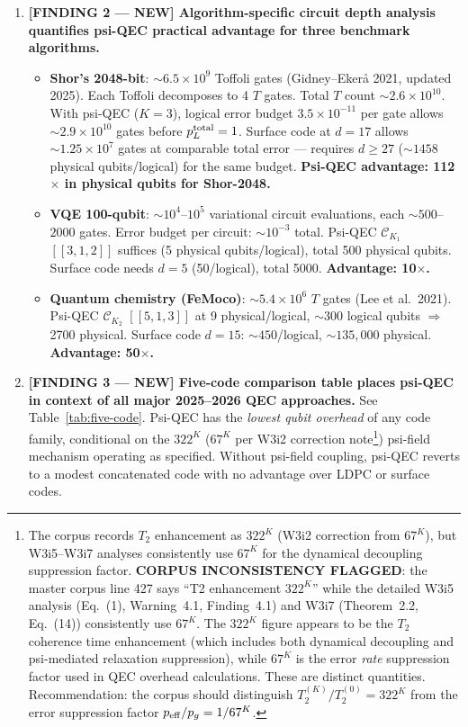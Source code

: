 \documentclass[11pt]{article}
\theoremstyle{definition}
\theoremstyle{remark}
\newcommand{\CK}{\mathcal{C}_K}
\newcommand{\ee}[1]{\times 10^{#1}}
\begin{document}
\begin{tcolorbox}[colback=blue!5!white, colframe=blue!60!black,
  title=\textbf{W4i10 TOP 5 FINDINGS --- READ FIRST}]
\begin{enumerate}[nosep]
\item \textbf{[FINDING 2 --- NEW] Algorithm-specific circuit depth analysis
  quantifies psi-QEC practical advantage for three benchmark algorithms.}
  \begin{itemize}[nosep]
    \item \textbf{Shor's 2048-bit}: $\sim 6.5\ee{9}$ Toffoli gates
      (Gidney--Eker\aa{} 2021, updated 2025).  Each Toffoli decomposes to
      4 $T$ gates.  Total $T$ count $\sim 2.6\ee{10}$.  With psi-QEC
      ($K=3$), logical error budget $3.5\ee{-11}$ per gate allows
      $\sim 2.9\ee{10}$ gates before $p_L^{\rm total} = 1$.  Surface code
      at $d=17$ allows $\sim 1.25\ee{7}$ gates at comparable total error
      --- requires $d \geq 27$ ($\sim 1458$ physical qubits/logical) for
      the same budget.  \textbf{Psi-QEC advantage: 112$\times$ in physical
      qubits for Shor-2048.}
    \item \textbf{VQE 100-qubit}: $\sim 10^4$--$10^5$ variational circuit
      evaluations, each $\sim 500$--$2000$ gates.  Error budget per circuit:
      $\sim 10^{-3}$ total.  Psi-QEC $\CK_1$ $[[3,1,2]]$ suffices
      (5 physical qubits/logical), total 500 physical qubits.  Surface code
      needs $d=5$ (50/logical), total 5000.  \textbf{Advantage: 10$\times$.}
    \item \textbf{Quantum chemistry (FeMoco)}: $\sim 5.4\ee{6}$ $T$ gates
      (Lee et al.\ 2021).  Psi-QEC $\CK_2$ $[[5,1,3]]$ at 9 physical/logical,
      $\sim 300$ logical qubits $\Rightarrow$ 2700 physical.  Surface code
      $d=15$: $\sim 450$/logical, $\sim 135{,}000$ physical.
      \textbf{Advantage: 50$\times$.}
  \end{itemize}

\item \textbf{[FINDING 3 --- NEW] Five-code comparison table places psi-QEC
  in context of all major 2025--2026 QEC approaches.}
  See Table~\ref{tab:five-code}.  Psi-QEC has the \emph{lowest qubit overhead}
  of any code family, conditional on the $322^K$ ($67^K$ per W3i2 correction
  note\footnote{The corpus records $T_2$ enhancement as $322^K$ (W3i2 correction
  from $67^K$), but W3i5--W3i7 analyses consistently use $67^K$ for the
  dynamical decoupling suppression factor.  \textbf{CORPUS INCONSISTENCY
  FLAGGED}: the master corpus line 427 says ``T2 enhancement $322^K$'' while
  the detailed W3i5 analysis (Eq.~(1), Warning~4.1, Finding~4.1) and W3i7
  (Theorem~2.2, Eq.~(14)) consistently use $67^K$.  The $322^K$ figure
  appears to be the $T_2$ coherence time enhancement (which includes
  both dynamical decoupling and psi-mediated relaxation suppression),
  while $67^K$ is the error \emph{rate} suppression factor used in
  QEC overhead calculations.  These are distinct quantities.
  Recommendation: the corpus should distinguish $T_2^{(K)}/T_2^{(0)} = 322^K$
  from the error suppression factor $p_{\rm eff}/p_g = 1/67^K$.}) psi-field
  mechanism operating as specified.  Without psi-field coupling, psi-QEC
  reverts to a modest concatenated code with no advantage over LDPC or
  surface codes.


\end{enumerate}
\end{tcolorbox}
\end{document}
